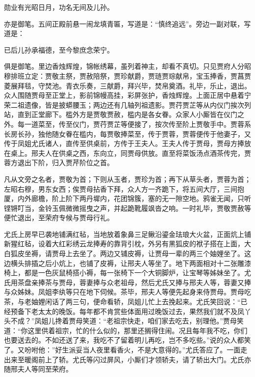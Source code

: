 勋业有光昭日月，功名无间及儿孙。

亦是御笔。五间正殿前悬一闹龙填青匾，写道是：``慎终追远''。旁边一副对联，写道是：

已后儿孙承福德，至今黎庶念荣宁。

俱是御笔。里边香烛辉煌，锦帐绣幕，虽列着神主，却看不真切。只见贾府人分昭穆排班立定：贾敬主祭，贾赦陪祭，贾珍献爵，贾琏贾琮献帛，宝玉捧香，贾菖贾菱展拜毯，守焚池。青衣乐奏，三献爵，拜兴毕，焚帛奠酒。礼毕，乐止，退出。众人围随贾母至正堂上，影前锦幔高挂，彩屏张护，香烛辉煌。上面正居中悬着宁荣二祖遗像，皆是披蟒腰玉；两边还有几轴列祖遗影。贾荇贾芷等从内仪门挨次列站，直到正堂廊下。槛外方是贾敬贾赦，槛内是各女眷。众家人小厮皆在仪门之外。每一道菜至，传至仪门，贾荇贾芷等便接了，按次传至阶上贾敬手中。贾蓉系长房长孙，独他随女眷在槛内，每贾敬捧菜至，传于贾蓉，贾蓉便传于他妻子，又传于凤姐尤氏诸人，直传至供桌前，方传于王夫人。王夫人传于贾母，贾母方捧放在桌上。邢夫人在供桌之西，东向立，同贾母供放。直至将菜饭汤点酒茶传完，贾蓉方退出下阶，归入贾芹阶位之首。

凡从文旁之名者，贾敬为首；下则从玉者，贾珍为首；再下从草头者，贾蓉为首；左昭右穆，男东女西；俟贾母拈香下拜，众人方一齐跪下，将五间大厅，三间抱厦，内外廊檐，阶上阶下两丹墀内，花团锦簇，塞的无一隙空地。鸦雀无闻，只听铿锵叮当，金铃玉佩微微摇曳之声，并起跪靴履飒沓之响。一时礼毕，贾敬贾赦等便忙退出，至荣府专候与贾母行礼。

尤氏上房早已袭地铺满红毡，当地放着象鼻三足鳅沿鎏金珐琅大火盆，正面炕上铺新猩红毡，设着大红彩绣云龙捧寿的靠背引枕，外另有黑狐皮的袱子搭在上面，大白狐皮坐褥，请贾母上去坐了。两边又铺皮褥，让贾母一辈的两三个妯娌坐了。这边横头排插之后小炕上，也铺了皮褥，让邢夫人等坐了。地下两面相对十二张雕漆椅上，都是一色灰鼠椅搭小褥，每一张椅下一个大铜脚炉，让宝琴等姊妹坐了。尤氏用茶盘亲捧茶与贾母，蓉妻捧与众老祖母，然后尤氏又捧与邢夫人等，蓉妻又捧与众姊妹。凤姐李纨等只在地下伺候。茶毕，邢夫人等便先起身来侍贾母。贾母吃茶，与老妯娌闲话了两三句，便命看轿，凤姐儿忙上去挽起来。尤氏笑回说：``已经预备下老太太的晚饭。每年都不肯赏些体面用过晚饭过去，果然我们就不及凤丫头不成？''凤姐儿搀着贾母笑道：``老祖宗快走，咱们家去吃去，别理他。''贾母笑道：``你这里供着祖宗，忙的什么似的，那里还搁得住闹。况且每年我不吃，你们也要送去的。不如还送了来，我吃不了留着明儿再吃，岂不多吃些。''说的众人都笑了。又吩咐他：''好生派妥当人夜里看香火，不是大意得的。''尤氏答应了。一面走出来至暖阁前上了轿。尤氏等闪过屏风，小厮们才领轿夫，请了轿出大门。尤氏亦随邢夫人等同至荣府。

